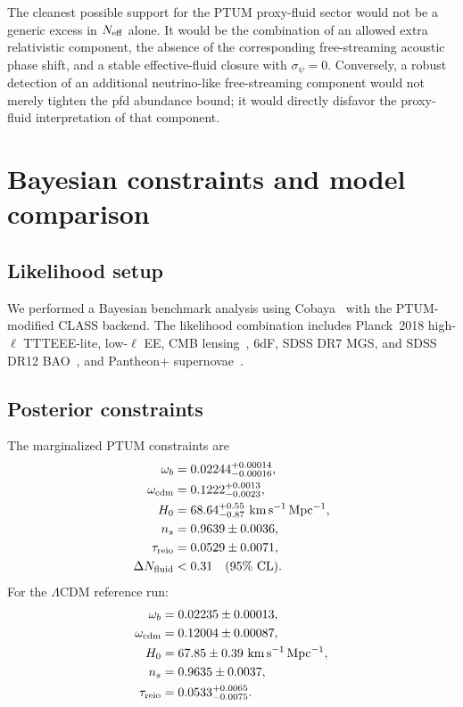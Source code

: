 \documentclass[epj]{svjour}
\begin{document}
The cleanest possible support for the PTUM proxy-fluid sector would not be a
generic excess in \(N_{\rm eff}\) alone.  It would be the combination of an
allowed extra relativistic component, the absence of the corresponding
free-streaming acoustic phase shift, and a stable effective-fluid closure with
\(\sigma_\psi=0\).  Conversely, a robust detection of an additional
neutrino-like free-streaming component would not merely tighten the pfd
abundance bound; it would directly disfavor the proxy-fluid interpretation of
that component.

\section{Bayesian constraints and model comparison}
\label{sec:mcmc}

\subsection{Likelihood setup}

We performed a Bayesian benchmark analysis using
Cobaya~\cite{Torrado2021} with the PTUM-modified CLASS backend.
The likelihood combination includes Planck~2018 high-\(\ell\)
TTTEEE-lite, low-\(\ell\) EE, CMB lensing~\cite{PlanckLike},
6dF, SDSS DR7 MGS, and SDSS DR12
BAO~\cite{Beutler2011,Ross2015,Alam2017}, and Pantheon+
supernovae~\cite{Brout2022}.

\subsection{Posterior constraints}

The marginalized PTUM constraints are
\begin{align}
\omega_b &= 0.02244^{+0.00014}_{-0.00016},\\
\omega_{\rm cdm} &= 0.1222^{+0.0013}_{-0.0023},\\
H_0 &= 68.64^{+0.55}_{-0.87}\ {\rm km\,s^{-1}\,Mpc^{-1}},\\
n_s &= 0.9639\pm0.0036,\\
\tau_{\rm reio} &= 0.0529\pm0.0071,\\
\Delta N_{\rm fluid} &< 0.31\quad(95\%\ {\rm CL}).
\label{eq:bound}
\end{align}
For the \(\Lambda\)CDM reference run:
\begin{align}
\omega_b &= 0.02235\pm0.00013,\\
\omega_{\rm cdm} &= 0.12004\pm0.00087,\\
H_0 &= 67.85\pm0.39\ {\rm km\,s^{-1}\,Mpc^{-1}},\\
n_s &= 0.9635\pm0.0037,\\
\tau_{\rm reio} &= 0.0533^{+0.0065}_{-0.0075}.
\end{align}
\end{document}
